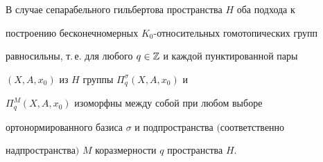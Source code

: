  


\begin{thm} 


В случае сепарабельного гильбертова пространства $H$ оба подхода к 


построению бесконечномерных $K_0$-относительных гомотопических групп 


равносильны, т.\,е. для любого $q\in\Bbb Z$ и каждой пунктированной пары 


$(X,A,x_0)$ из $H$ группы $\Pi^\sigma_q(X,A,x_0)$ и 


$\Pi^M_q(X,A,x_0)$ изоморфны между собой при любом выборе 


ортонормированного базиса $\sigma$ и подпространства $($соответственно 


надпространства$)$ $M$ коразмерности $q$ пространства $H$. 


\end{thm} 


 


